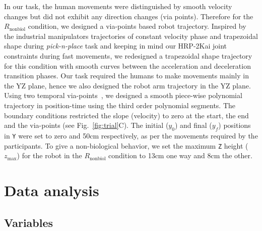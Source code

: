 In our task, the human movements were distinguished by smooth velocity changes but did not exhibit any direction changes (via points). Therefore for the $R_{\text{nonbiol}}$ condition, we designed a via-points based robot trajectory. Inspired by the industrial manipulators trajectories of constant velocity phase and trapezoidal shape during {\it pick-n-place} task and keeping in mind our HRP-2Kai joint constraints during fast movements, we redesigned a trapezoidal shape trajectory for this condition with smooth curves between the acceleration and deceleration transition phases. Our task required the humans to make movements mainly in the YZ plane, hence we also designed the robot arm trajectory in the YZ plane. Using two temporal via-points~\cite{Biagiotti:Springer:2008}, we designed a smooth piece-wise polynomial trajectory in position-time using the third order polynomial segments. The boundary conditions restricted the slope (velocity) to zero at the start, the end and the via-points (see Fig.~\ref{fig:trial}C). The initial ($y_0$) and final ($y_f$) positions in \texttt{Y} were set to zero and 50cm respectively, as per the movements required by the participants. To give a non-biological behavior, we set the maximum \texttt{Z} height ($z_{\max}$) for the robot in the $R_{\text{nonbiol}}$ condition to 13cm one way and 8cm the other. 



\clearpage

\section{Data analysis}

\subsection{Variables}

